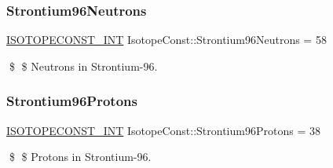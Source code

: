 \subsubsection{\texorpdfstring{Strontium96\+Neutrons}{Strontium96Neutrons}}
{\footnotesize\ttfamily \mbox{\hyperlink{group___isotope_const-_macros_ga5f18360b3e99483a35c32d789e62621c}{I\+S\+O\+T\+O\+P\+E\+C\+O\+N\+S\+T\+\_\+\+I\+NT}} Isotope\+Const\+::\+Strontium96\+Neutrons = 58}

\$ \$ Neutrons in Strontium-\/96. \mbox{\label{group___isotope_const-_strontium-_sr96_ga0b6a57c8a0a338248b443e1a30974b1d}} 
\subsubsection{\texorpdfstring{Strontium96\+Protons}{Strontium96Protons}}
{\footnotesize\ttfamily \mbox{\hyperlink{group___isotope_const-_macros_ga5f18360b3e99483a35c32d789e62621c}{I\+S\+O\+T\+O\+P\+E\+C\+O\+N\+S\+T\+\_\+\+I\+NT}} Isotope\+Const\+::\+Strontium96\+Protons = 38}

\$ \$ Protons in Strontium-\/96. 